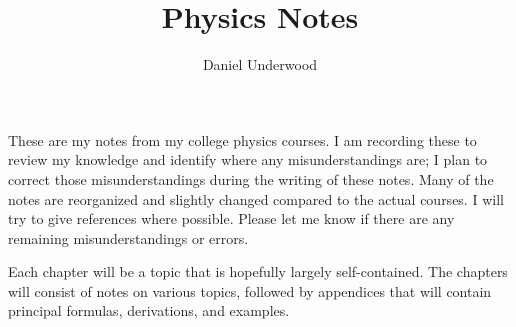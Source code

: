 \documentclass[10pt,a4paper]{book}
\author{Daniel Underwood}
\title{Physics Notes}
\begin{document}
\maketitle

\vspace*{\fill}
These are my notes from my college physics courses. I am recording these to review my
knowledge and identify where any misunderstandings are; I plan to correct those
misunderstandings during the writing of these notes. Many of the notes are reorganized
and slightly changed compared to the actual courses. I will try to give references where
possible. Please let me know if there are any remaining misunderstandings or errors.

Each chapter will be a topic that is hopefully largely self-contained. The chapters will
consist of notes on various topics, followed by appendices that will contain principal
formulas, derivations, and examples.
\vspace*{\fill}

\tableofcontents
\newpage

\end{document}
